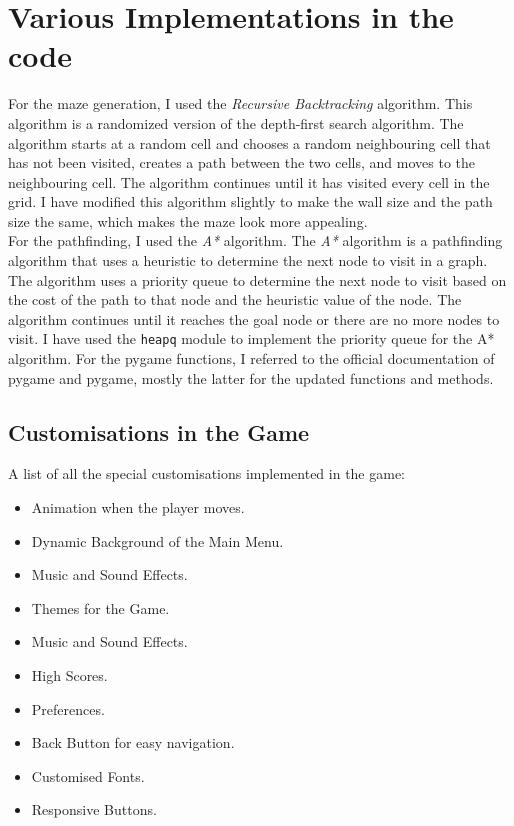 \documentclass[10pt]{article}
\begin{document}
    \section{Various Implementations in the code}\label{sec:my-project-journey-and-various-implementations-in-the-code}
    For the maze generation, I used the \emph{Recursive Backtracking} algorithm.
    This algorithm is a randomized version of the depth-first search algorithm.
    The algorithm starts at a random cell and chooses a random neighbouring cell that has not been visited, creates a path between the two cells, and moves to the neighbouring cell.
    The algorithm continues until it has visited every cell in the grid.
    I have modified this algorithm slightly to make the wall size and the path size the same, which makes the maze look more appealing.
    \cite{MazeGeneration}\\
    For the pathfinding, I used the \emph{A*} algorithm.
    The \emph{A*} algorithm is a pathfinding algorithm that uses a heuristic to determine the next node to visit in a graph.
    The algorithm uses a priority queue to determine the next node to visit based on the cost of the path to that node and the heuristic value of the node.
    The algorithm continues until it reaches the goal node or there are no more nodes to visit.
    I have used the \texttt{heapq} module to implement the priority queue for the A* algorithm.
    \cite{MazeSolver}
    For the pygame functions, I referred to the official documentation of pygame\cite{pygameDoc} and pygame\cite{pygameCEDoc}, mostly the latter for the updated functions and methods.\\

    \subsection{Customisations in the Game}\label{subsec:customisations-in-the-game}
    A list of all the special customisations implemented in the game:
    \begin{itemize}
        \item Animation when the player moves.
        \item Dynamic Background of the Main Menu.
        \item Music and Sound Effects.
        \item Themes for the Game.
        \item Music and Sound Effects.
        \item High Scores.
        \item Preferences.
        \item Back Button for easy navigation.
        \item Customised Fonts.
        \item Responsive Buttons.
    \end{itemize}
\end{document}
